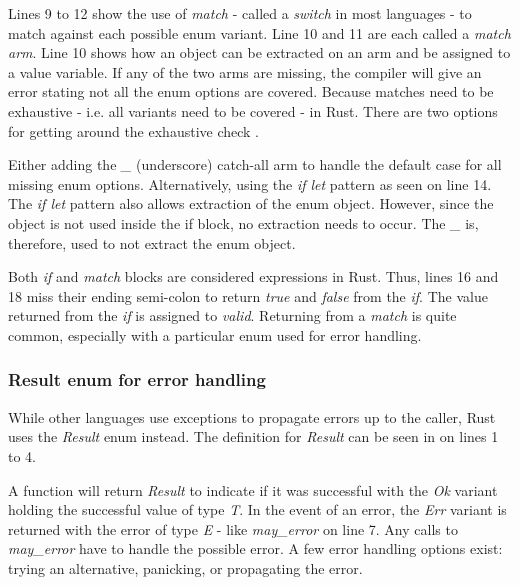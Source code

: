 
Lines 9 to 12 show the use of \textit{match} - called a \textit{switch} in most languages - to match against each possible enum variant.
Line 10 and 11 are each called a \textit{match arm}.
Line 10 shows how an object can be extracted on an arm and be assigned to a value variable.
If any of the two arms are missing, the compiler will give an error stating not all the enum options are covered.
Because matches need to be exhaustive - i.e. all variants need to be covered - in Rust.
There are two options for getting around the exhaustive check \cite{klabnik_2019_01}.

Either adding the \textit{\_} (underscore) catch-all arm to handle the default case for all missing enum options.
Alternatively, using the \textit{if let} pattern as seen on line 14.
The \textit{if let} pattern also allows extraction of the enum object.
However, since the object is not used inside the if block, no extraction needs to occur.
The \textit{\_} is, therefore, used to not extract the enum object.

Both \textit{if} and \textit{match} blocks are considered expressions in Rust.
Thus, lines 16 and 18 miss their ending semi-colon to return \textit{true} and \textit{false} from the \textit{if}.
The value returned from the \textit{if} is assigned to \textit{valid}.
Returning from a \textit{match} is quite common, especially with a particular enum used for error handling.

\subsubsection{Result enum for error handling}
While other languages use exceptions to propagate errors up to the caller, Rust uses the \textit{Result} enum instead.
The definition for \textit{Result} can be seen in  on lines 1 to 4.


A function will return \textit{Result} to indicate if it was successful with the \textit{Ok} variant holding the successful value of type \textit{T}.
In the event of an error, the \textit{Err} variant is returned with the error of type \textit{E} - like \textit{may\_error} on line 7.
Any calls to \textit{may\_error} have to handle the possible error.
A few error handling options exist: trying an alternative, panicking, or propagating the error.

